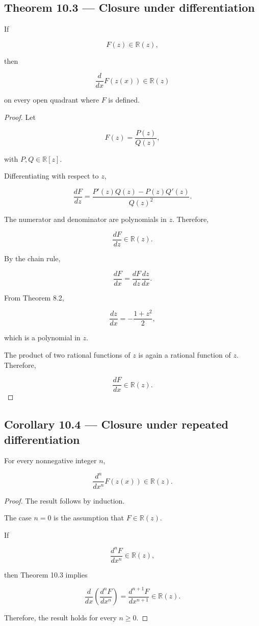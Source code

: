 \documentclass[11pt,oneside,openany]{book}
\newcommand{\PCsubsection}[1]{%
  \subsection*{#1}%
}
\begin{document}
\PCsubsection{Theorem 10.3 --- Closure under differentiation}

If

\[
F(z)\in\mathbb R(z),
\]

then

\[
\frac{d}{dx}F(z(x)) \in\mathbb R(z)
\]

on every open quadrant where \(F\) is defined.

\begin{proof}
Let

\[
F(z)=\frac{P(z)}{Q(z)},
\]

with \(P,Q\in\mathbb R[z]\).

Differentiating with respect to \(z\),

\[
\frac{dF}{dz} = \frac{P'(z)Q(z)-P(z)Q'(z)} {Q(z)^2}.
\]

The numerator and denominator are polynomials in \(z\). Therefore,

\[
\frac{dF}{dz}\in\mathbb R(z).
\]

By the chain rule,

\[
\frac{dF}{dx} = \frac{dF}{dz}\frac{dz}{dx}.
\]

From Theorem 8.2,

\[
\frac{dz}{dx} = -\frac{1+z^2}{2},
\]

which is a polynomial in \(z\).

The product of two rational functions of \(z\) is again a rational function of \(z\). Therefore,

\[
\frac{dF}{dx}\in\mathbb R(z).
\]

\end{proof}

\PCsubsection{Corollary 10.4 --- Closure under repeated differentiation}

For every nonnegative integer \(n\),

\[
\boxed{ \frac{d^n}{dx^n}F(z(x)) \in\mathbb R(z) }.
\]

\begin{proof}
The result follows by induction.

The case \(n=0\) is the assumption that \(F\in\mathbb R(z)\).

If

\[
\frac{d^nF}{dx^n}\in\mathbb R(z),
\]

then Theorem 10.3 implies

\[
\frac{d}{dx} \left( \frac{d^nF}{dx^n} \right) = \frac{d^{n+1}F}{dx^{n+1}} \in\mathbb R(z).
\]

Therefore, the result holds for every \(n\geq0\).


\end{proof}
\end{document}
